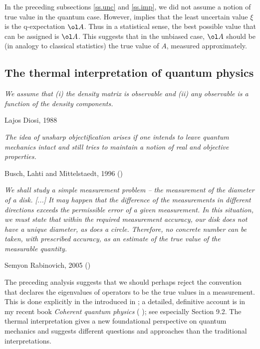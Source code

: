 \documentclass[12pt]{article}
\begin{document}
In the preceding subsections \ref{ss.unc} and \ref{ss.imp}, we did not
assume a notion of true value in the quantum case.
However,  implies that the least uncertain value $\xi$
is the q-expectation $\ol A$. Thus in a statistical sense, the best
possible value that can be assigned is $\ol A$. This suggests that in
the unbiased case, $\ol A$ should be (in analogy to classical
statistics) the true value of $A$, measured approximately.




\subsection{The thermal interpretation of quantum physics}
\label{ss.thermal}

\nopagebreak
\hfill\parbox[t]{10.8cm}{\footnotesize

{\em We assume that (i) the density matrix is observable and
(ii) any observable is a function of the density components.}

\hfill Lajos Diosi, 1988 \cite[p.2887]{Dio}
}

\bigskip


\nopagebreak
\hfill\parbox[t]{10.8cm}{\footnotesize

{\em The idea of unsharp objectification arises if one intends to leave
quantum mechanics intact and still tries to maintain a notion of real
and objective properties.
}

\hfill Busch, Lahti and Mittelstaedt, 1996 (\cite[p.127]{BusLM})
}

\bigskip


\nopagebreak
\hfill\parbox[t]{10.8cm}{\footnotesize

{\em 
We shall study a simple measurement problem -- the measurement of the
diameter of a disk. [...] It may happen that the difference of the
measurements in different directions exceeds the permissible error of a
given measurement. In this situation, we must state that within the
required measurement accuracy, our disk does not have a unique diameter,
as does a circle. Therefore, no concrete number can be taken, with
prescribed accuracy, as an estimate of the true value of the measurable
quantity.}

\hfill Semyon Rabinovich, 2005 (\cite[p.11]{Rab})
}

\bigskip


The preceding analysis suggests that we should perhaps reject the 
convention that declares the eigenvalues of operators to be the true
values in a measurement. This is done explicitly in the
 introduced in
 \cite{Neu.IIfound,Neu.IIIfound,Neu.IVfound}; a detailed,
definitive account is in my recent book {\it Coherent quantum physics}
( \cite{Neu.CQP}); see especially Section 9.2. The thermal
interpretation gives a new foundational perspective on quantum mechanics
and suggests different questions and approaches than the traditional
interpretations.
\end{document}
